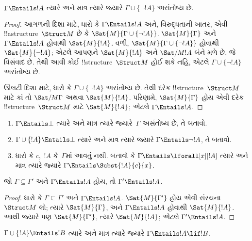 \documentclass[../../../include/open-logic-section]{subfiles}
\begin{document}
\begin{prop}
$\Gamma\Entails !A$ ત્યારે અને માત્ર ત્યારે જ્યારે
$\Gamma\cup\{\lnot !A\}$ અસંતોષ્ય છે.
\end{prop}

\begin{proof}
આગળની દિશા માટે, ધારો કે $\Gamma\Entails !A$ અને, વિરુદ્ધતાની ખાતર,
એવી !!a{structure}~$\Struct M$ છે કે
$\Sat{M}{\Gamma\cup\{\lnot !A\}}$. $\Sat{M}{\Gamma}$ અને
$\Gamma\Entails !A$ હોવાથી $\Sat{M}{!A}$. વળી,
$\Sat{M}{\Gamma\cup\{\lnot !A\}}$ હોવાથી $\Sat{M}{\lnot !A}$; એટલે
આપણને $\Sat{M}{!A}$ અને $\Sat/{M}{!A}$ બંને મળે છે, જે વિસંવાદ છે.
તેથી આવી કોઈ !!{structure}~$\Struct M$ હોઈ શકે નહિ, એટલે
$\Gamma\cup\{\lnot !A\}$ અસંતોષ્ય છે.

ઊલટી દિશા માટે, ધારો કે $\Gamma\cup\{\lnot !A\}$ અસંતોષ્ય છે. તેથી
દરેક !!{structure}~$\Struct M$ માટે કાં તો $\Sat/{M}{\Gamma}$ અથવા
$\Sat{M}{!A}$. પરિણામે, $\Sat{M}{\Gamma}$ હોય એવી દરેક
!!{structure}~$\Struct M$ માટે $\Sat{M}{!A}$; એટલે
$\Gamma\Entails !A$.
\end{proof}

\begin{prob}
\begin{enumerate}
\item $\Gamma\Entails\bot$ ત્યારે અને માત્ર ત્યારે જ્યારે~$\Gamma$
  અસંતોષ્ય છે, તે બતાવો.
\item $\Gamma\cup\{!A\}\Entails\bot$ ત્યારે અને માત્ર ત્યારે જ્યારે
  $\Gamma\Entails\lnot !A$, તે બતાવો.
\item ધારો કે $c$,~$!A$ કે~$\Gamma$માં આવતું નથી. બતાવો કે
  $\Gamma\Entails\lforall[x][!A]$ ત્યારે અને માત્ર ત્યારે જ્યારે
  $\Gamma\Entails\Subst{!A}{c}{x}$.
\end{enumerate}
\end{prob}

\begin{prop}
જો $\Gamma\subseteq\Gamma'$ અને $\Gamma\Entails !A$ હોય, તો
$\Gamma'\Entails !A$.
\end{prop}

\begin{proof}
ધારો કે $\Gamma\subseteq\Gamma'$ અને $\Gamma\Entails !A$.
$\Sat{M}{\Gamma'}$ હોય એવી સંરચના~$\Struct M$ લો; ત્યારે
$\Sat{M}{\Gamma}$, અને $\Gamma\Entails !A$ હોવાથી $\Sat{M}{!A}$.
આથી જ્યારે પણ $\Sat{M}{\Gamma'}$, ત્યારે $\Sat{M}{!A}$; એટલે
$\Gamma'\Entails !A$.
\end{proof}


\begin{thm}[અર્થાનુસારી નિગમન પ્રમેય]
$\Gamma\cup\{!A\}\Entails !B$ ત્યારે અને માત્ર ત્યારે જ્યારે
$\Gamma\Entails !A\lif !B$.
\end{thm}
\end{document}
